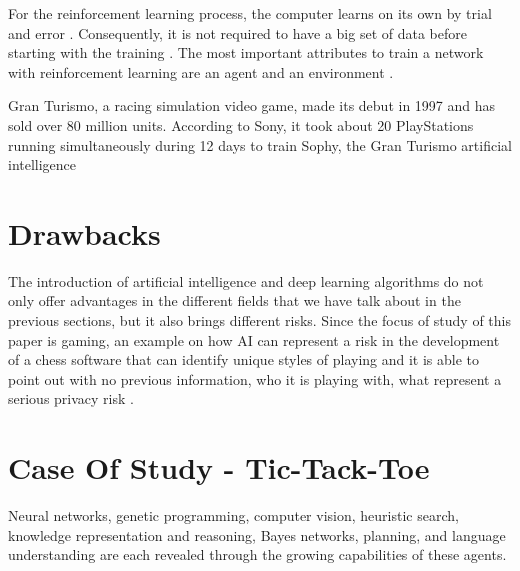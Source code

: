 \documentclass[conference]{IEEEtran}
\begin{document}
For the reinforcement learning process, the computer learns on its own by trial and error \cite{racingpdf}. Consequently, it is not required to have a big set of data before starting with the training \cite{racingpdf}. The most important attributes to train a network with reinforcement learning are an agent and an environment \cite{racingpdf}.

Gran Turismo, a racing simulation video game, made its debut in 1997 and has sold over 80 million units.
According to Sony, it took about 20 PlayStations running simultaneously during 12 days to train Sophy, the Gran Turismo artificial intelligence 


\section{Drawbacks}

The introduction of artificial intelligence and deep learning algorithms do not only offer advantages in the different fields that we have talk about in the previous sections, but it also brings different risks. Since the focus of study of this paper is gaming, an example on how AI can represent a risk in the development of a chess software that can identify unique styles of playing and it is able to point out with no previous information, who it is playing with, what represent a serious privacy risk \cite{unmask}.

\section{Case Of Study - Tic-Tack-Toe}



Neural networks, genetic programming, computer vision, heuristic search, knowledge representation and reasoning, Bayes networks, planning, and language understanding are each revealed through the growing capabilities of these agents.
\end{document}
